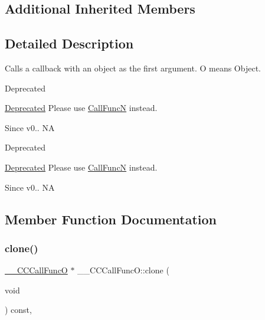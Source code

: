 \subsection*{Additional Inherited Members}


\subsection{Detailed Description}
Calls a \textquotesingle{}callback\textquotesingle{} with an object as the first argument. O means Object. 

\begin{DoxyRefDesc}{Deprecated}
\item[\hyperlink{deprecated__deprecated000012}{Deprecated}]Please use \hyperlink{classCallFuncN}{Call\+FuncN} instead. \end{DoxyRefDesc}
\begin{DoxySince}{Since}
v0..  NA
\end{DoxySince}
\begin{DoxyRefDesc}{Deprecated}
\item[\hyperlink{deprecated__deprecated000242}{Deprecated}]Please use \hyperlink{classCallFuncN}{Call\+FuncN} instead. \end{DoxyRefDesc}
\begin{DoxySince}{Since}
v0..  NA 
\end{DoxySince}


\subsection{Member Function Documentation}
\mbox{\label{class____CCCallFuncO_ae01d43dd90e3052c278e1431097c2b2e}} 
\subsubsection{\texorpdfstring{clone()}{clone()}\hspace{0.1cm}{\footnotesize\ttfamily [1/2]}}
{\footnotesize\ttfamily \hyperlink{class____CCCallFuncO}{\+\_\+\+\_\+\+C\+C\+Call\+FuncO} $\ast$ \+\_\+\+\_\+\+C\+C\+Call\+Func\+O\+::clone (\begin{DoxyParamCaption}\item[{void}]{ }\end{DoxyParamCaption}) const\hspace{0.3cm}{\ttfamily [override]}, {\ttfamily [virtual]}}

